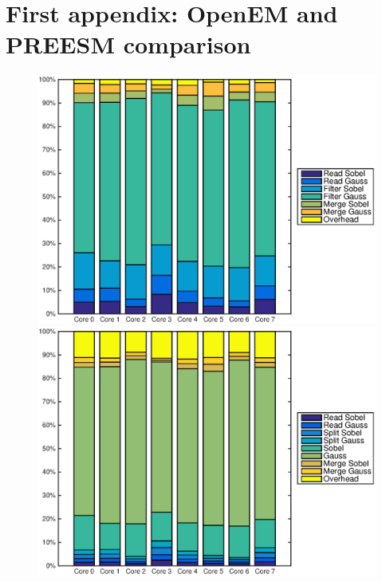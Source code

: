 \chapter{First appendix: OpenEM and PREESM comparison}
\label{chapter:first-appendix}
\begin{figure}
    \centering
    \begin{minipage}{0.45\textwidth}
        \centering
        \includegraphics[width=0.99\linewidth]{images/openem_cifcif_8cores_eo.eps}
    \end{minipage}
    \hfill
    \begin{minipage}{0.45\textwidth}
        \centering
        \includegraphics[width=0.99\linewidth]{images/openem_cifcif_8cores_func.eps}
    \end{minipage}%
\end{figure}
